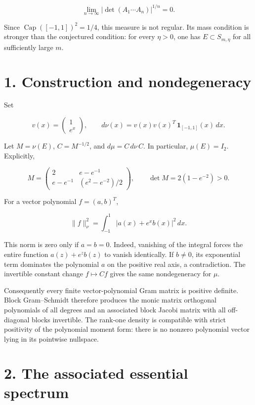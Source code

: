 \documentclass[11pt,a4paper]{article}
\begin{document}
\[
\lim_{n\to\infty}|\det(A_1\cdots A_n)|^{1/n}=0.
\]

Since \(\operatorname{Cap}([-1,1])^2=1/4\), this measure is not regular.
Its mass condition is stronger than the conjectured condition: for every
\(\eta>0\), one has \(E\subset S_{m,\eta}\) for all sufficiently large
\(m\).

\hypertarget{1035-construction-and-nondegeneracy}{%
\section{1. Construction and
nondegeneracy}\label{1035-construction-and-nondegeneracy}}

Set

\[
v(x)=\begin{pmatrix}1\\e^x\end{pmatrix},\qquad
d\nu(x)=v(x)v(x)^T\,\mathbf1_{[-1,1]}(x)\,dx.
\]

Let \(M=\nu(E)\), \(C=M^{-1/2}\), and \(d\mu=C\,d\nu\,C\). In
particular, \(\mu(E)=I_2\). Explicitly,

\[
M=\begin{pmatrix}
2&e-e^{-1}\\
e-e^{-1}&(e^2-e^{-2})/2
\end{pmatrix},\qquad
\det M=2(1-e^{-2})>0.
\]

For a vector polynomial \(f=(a,b)^T\),

\[
\|f\|_\nu^2=\int_{-1}^1|a(x)+e^x b(x)|^2\,dx.
\]

This norm is zero only if \(a=b=0\). Indeed, vanishing of the integral
forces the entire function \(a(z)+e^z b(z)\) to vanish identically. If
\(b\ne0\), its exponential term dominates the polynomial \(a\) on the
positive real axis, a contradiction. The invertible constant change
\(f\mapsto Cf\) gives the same nondegeneracy for \(\mu\).

Consequently every finite vector-polynomial Gram matrix is positive
definite. Block Gram--Schmidt therefore produces the monic matrix
orthogonal polynomials of all degrees and an associated block Jacobi
matrix with all off-diagonal blocks invertible. The rank-one density is
compatible with strict positivity of the polynomial moment form: there
is no nonzero polynomial vector lying in its pointwise nullspace.

\hypertarget{1035-the-associated-essential-spectrum}{%
\section{2. The associated essential
spectrum}\label{1035-the-associated-essential-spectrum}}
\end{document}
